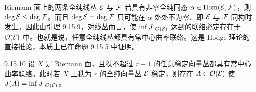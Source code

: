   Riemann 面上的两条全纯线丛 $\mathcal{E}$ 与 $\mathcal{F}$ 若具有非零全纯同态 $\alpha\in\operatorname{Hom}(\mathcal{E},\mathcal{F})$，则 $\deg\mathcal{E}\le\deg\mathcal{F}$。而且 $\deg\mathcal{E}=\deg\mathcal{F}$ 只可能在 $\alpha$ 处处不为零、即 $\mathcal{E}$ 与 $\mathcal{F}$ 同构时发生。因此由引理 9.15.9，对线丛而言，使 $\inf J|_{\mathcal{O}(\mathcal{E})}$ 达到的联络必定存在于 $\mathcal{O}(\mathcal{E})$ 中。也就是说，任意全纯线丛都具有常中心曲率联络。这是 Hodge 理论的直接推论，本质上已在命题 9.15.5 中证明。

\begin{proposition}{9.15.10}
  设 $X$ 是 Riemann 面，且秩不超过 $r-1$ 的任意稳定向量丛都具有常中心曲率联络。此时若 $X$ 上秩为 $r$ 的全纯向量丛 $\mathcal{E}$ 稳定，则存在 $A\in\mathcal{O}(\mathcal{E})$ 使 $J(A)=\inf J|_{\mathcal{O}(\mathcal{E})}$。
\end{proposition}
